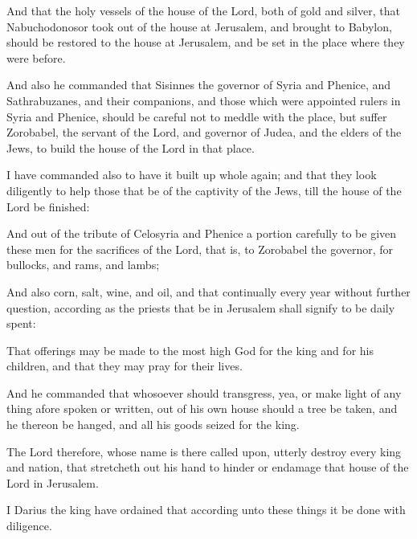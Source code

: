 {\par }{\PP {}And that the holy vessels of the house of the Lord, both of gold and silver, that Nabuchodonosor took out of the house at Jerusalem, and brought to Babylon, should be restored to the house at Jerusalem, and be set in the place where they were before.
\par }{\PP {}And also he commanded that Sisinnes the governor of Syria and Phenice, and Sathrabuzanes, and their companions, and those which were appointed rulers in Syria and Phenice, should be careful not to meddle with the place, but suffer Zorobabel, the servant of the Lord, and governor of Judea, and the elders of the Jews, to build the house of the Lord in that place.
\par }{\PP {}I have commanded also to have it built up whole again; and that they look diligently to help those that be of the captivity of the Jews, till the house of the Lord be finished:
\par }{\PP {}And out of the tribute of Celosyria and Phenice a portion carefully to be given these men for the sacrifices of the Lord, that is, to Zorobabel the governor, for bullocks, and rams, and lambs;
\par }{\PP {}And also corn, salt, wine, and oil, and that continually every year without further question, according as the priests that be in Jerusalem shall signify to be daily spent:
\par }{\PP {}That offerings may be made to the most high God for the king and for his children, and that they may pray for their lives.
\par }{\PP {}And he commanded that whosoever should transgress, yea, or make light of any thing afore spoken or written, out of his own house should a tree be taken, and he thereon be hanged, and all his goods seized for the king.
\par }{\PP {}The Lord therefore, whose name is there called upon, utterly destroy every king and nation, that stretcheth out his hand to hinder or endamage that house of the Lord in Jerusalem.
\par }{\PP {}I Darius the king have ordained that according unto these things it be done with diligence.

}
